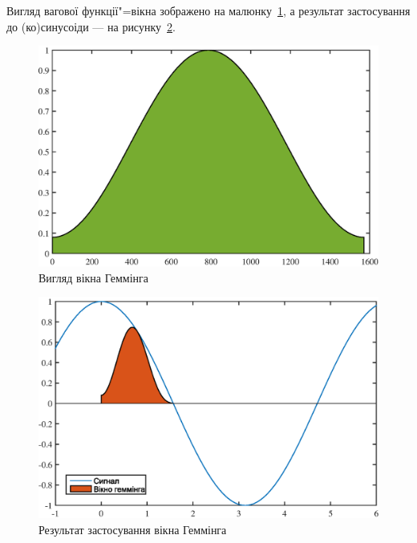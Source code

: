 \begin{enumerate}
                Вигляд вагової функції"=вікна зображено на малюнку~\ref{fig:hamming}, а результат застосування до
                (ко)синусоіди --- на рисунку~\ref{fig:hamming-appl}.

                \begin{figure}[h]
                    \centering
                    \includegraphics[width=\textwidth]{hamming.eps}
                    \caption{Вигляд вікна Геммінга}
                    \label{fig:hamming}
                \end{figure}

                \begin{figure}[h]
                    \centering
                    \includegraphics[width=\textwidth]{hamming-appl.eps}
                    \caption{Результат застосування вікна Геммінга}
                    \label{fig:hamming-appl}
                \end{figure}
        \end{enumerate}

